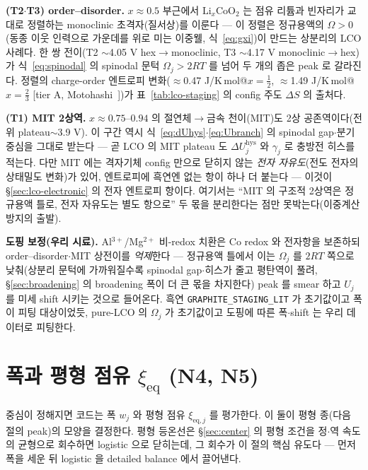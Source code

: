 \documentclass[11pt,a4paper]{article}
\newcommand{\eq}{\mathrm{eq}}
\newcommand{\hys}{\mathrm{hys}}
\newcommand{\code}[1]{\texttt{#1}}
\begin{document}
\textbf{(T2$\cdot$T3) order--disorder.} $x\approx0.5$ 부근에서 $\mathrm{Li}_x\mathrm{CoO_2}$ 는 점유 리튬과 빈자리가
교대로 정렬하는 monoclinic 초격자(질서상)를 이룬다 — 이 정렬은 정규용액의 $\Omega>0$(동종 이웃 인력으로 가운데를 위로
미는 이중웰, 식~\eqref{eq:gxi})이 만드는 상분리의 LCO 사례다. 한 쌍 전이(T2 $\sim$4.05 V hex$\to$monoclinic,
T3 $\sim$4.17 V monoclinic$\to$hex)가 식~\eqref{eq:spinodal} 의 spinodal 문턱 $\Omega_j>2RT$ 를 넘어 두 개의 좁은
peak 로 갈라진다. 정렬의 charge-order 엔트로피 변화($\approx$0.47 J/K\,mol@$x{=}\tfrac12$, $\approx$1.49 J/K\,mol@$x{=}\tfrac23$
[tier A, Motohashi~\cite{motohashi2009}])가 표~\ref{tab:lco-staging} 의 config 주도 $\Delta S$ 의 출처다.

\textbf{(T1) MIT 2상역.} $x\approx0.75$--$0.94$ 의 절연체$\to$금속 천이(MIT)도 2상 공존역이다(전위 plateau$\sim$3.9 V).
이 구간 역시 식~\eqref{eq:dUhys}$\cdot$\eqref{eq:Ubranch} 의 spinodal gap$\cdot$분기 중심을 그대로 받는다 — 곧 LCO 의
MIT plateau 도 $\Delta U_j^\hys$ 와 $\gamma_j$ 로 충방전 히스를 적는다. 다만 MIT 에는 격자기체 config 만으로 닫히지 않는
\emph{전자 자유도}(전도 전자의 상태밀도 변화)가 있어, 엔트로피에 흑연엔 없는 항이 하나 더 붙는다 — 이것이
\S\ref{sec:lco-electronic} 의 전자 엔트로피 항이다. 여기서는 ``MIT 의 구조적 2상역은 정규용액 틀로, 전자 자유도는 별도
항으로'' 두 몫을 분리한다는 점만 못박는다(이중계산 방지의 출발).

\textbf{도핑 보정(우리 시료).} Al$^{3+}$/Mg$^{2+}$ 비-redox 치환은 Co redox 와 전자항을 보존하되 order--disorder$\cdot$MIT
상전이를 \emph{억제}한다 — 정규용액 틀에서 이는 $\Omega_j$ 를 $2RT$ 쪽으로 낮춰(상분리 문턱에 가까워질수록
spinodal gap$\cdot$히스가 줄고 평탄역이 풀려, \S\ref{sec:broadening} 의 broadening 폭이 더 큰 몫을 차지한다)
peak 를 smear 하고 $U_j$ 를 미세 shift 시키는 것으로 들어온다. 흑연 \code{GRAPHITE\_STAGING\_LIT} 가 초기값이고 폭이
피팅 대상이었듯, pure-LCO 의 $\Omega_j$ 가 초기값이고 도핑에 따른 폭$\cdot$shift 는 우리 데이터로 피팅한다.

\section{폭과 평형 점유 $\xi_\eq$ (N4, N5)}\label{sec:width}
중심이 정해지면 코드는 폭 $w_j$ 와 평형 점유 $\xi_{\eq,j}$ 를 평가한다. 이 둘이 평형 종(다음 절의 peak)의 모양을
결정한다. 평형 등온선은 \S\ref{sec:center} 의 평형 조건을 정$\cdot$역 속도의 균형으로 회수하면 logistic 으로 닫히는데,
그 회수가 이 절의 핵심 유도다 — 먼저 폭을 세운 뒤 logistic 을 detailed balance 에서 끌어낸다.
\end{document}
